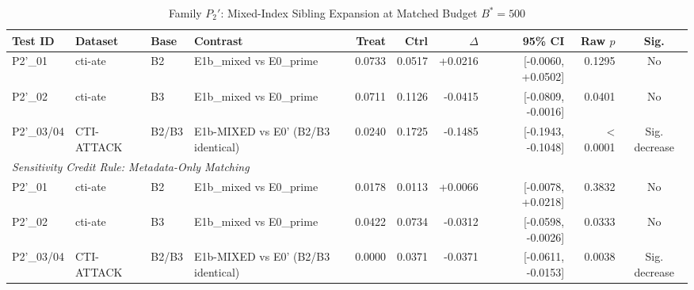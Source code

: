 \begin{table}[htbp]
\centering
\caption{Family $P_2'$: Mixed-Index Sibling Expansion at Matched Budget $B^*=500$}
\label{tab:family_p2_prime}
\small
\begin{tabular}{llllrrrrrc}
\hline
\textbf{Test ID} & \textbf{Dataset} & \textbf{Base} & \textbf{Contrast} & \textbf{Treat} & \textbf{Ctrl} & \textbf{$\Delta$} & \textbf{95\% CI} & \textbf{Raw $p$} & \textbf{Sig.} \\
\hline
P2'_01 & cti-ate & B2 & E1b_mixed vs E0_prime & 0.0733 & 0.0517 & +0.0216 & [-0.0060, +0.0502] & 0.1295 & No \\
P2'_02 & cti-ate & B3 & E1b_mixed vs E0_prime & 0.0711 & 0.1126 & -0.0415 & [-0.0809, -0.0016] & 0.0401 & No \\
P2'_03/04 & CTI-ATTACK & B2/B3 & E1b-MIXED vs E0' (B2/B3 identical) & 0.0240 & 0.1725 & -0.1485 & [-0.1943, -0.1048] & < 0.0001 & Sig. decrease \\
\hline
\multicolumn{10}{l}{\textit{Sensitivity Credit Rule: Metadata-Only Matching}} \\
P2'_01 & cti-ate & B2 & E1b_mixed vs E0_prime & 0.0178 & 0.0113 & +0.0066 & [-0.0078, +0.0218] & 0.3832 & No \\
P2'_02 & cti-ate & B3 & E1b_mixed vs E0_prime & 0.0422 & 0.0734 & -0.0312 & [-0.0598, -0.0026] & 0.0333 & No \\
P2'_03/04 & CTI-ATTACK & B2/B3 & E1b-MIXED vs E0' (B2/B3 identical) & 0.0000 & 0.0371 & -0.0371 & [-0.0611, -0.0153] & 0.0038 & Sig. decrease \\
\hline
\end{tabular}
\end{table}

